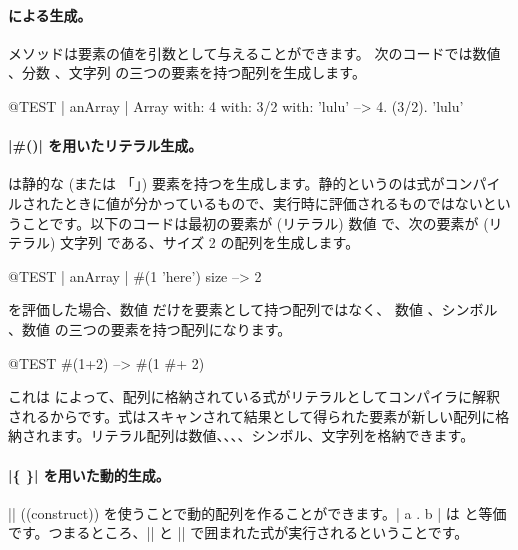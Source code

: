 \documentclass[a4paper,10pt,twoside]{book}
\begin{document}
\paragraph{ による生成。}  メソッドは要素の値を引数として与えることができます。
次のコードでは数値 、分数 、文字列  の三つの要素を持つ配列を生成します。

\begin{code}{@TEST | anArray |}
Array with: 4 with: 3/2 with: 'lulu' -->  {4. (3/2). 'lulu'}
\end{code}

\paragraph{\ct|\#()| を用いたリテラル生成。}
\ct{#()} は静的な (または 「」) 要素を持つを生成します。静的というのは式がコンパイルされたときに値が分かっているもので、実行時に評価されるものではないということです。以下のコードは最初の要素が (リテラル) 数値  で、次の要素が (リテラル) 文字列  である、サイズ 2 の配列を生成します。


\begin{code}{@TEST | anArray |}
#(1 'here') size --> 2
\end{code}

 を評価した場合、数値  だけを要素として持つ配列ではなく、 \ie 数値 、シンボル \ct{#+}、数値  の三つの要素を持つ配列になります。

\begin{code}{@TEST}
#(1+2) -->  #(1 #+ 2)
\end{code}

\noindent
これは \ct{#()} によって、配列に格納されている式がリテラルとしてコンパイラに解釈されるからです。式はスキャンされて結果として得られた要素が新しい配列に格納されます。リテラル配列は数値、、、、シンボル、文字列を格納できます。

\paragraph{\ct|\{ \}| を用いた動的生成。}
\ct|{}| ((construct)) を使うことで動的配列を作ることができます。\ct|{ a . b }| は  と等価です。つまるところ、\ct|{| と \ct|}| で囲まれた式が実行されるということです。
\end{document}
